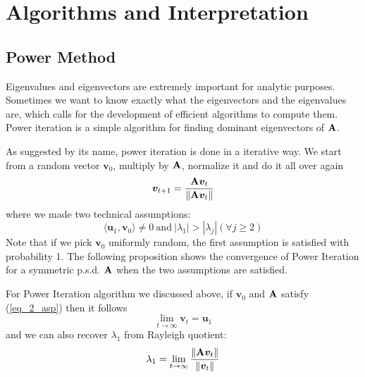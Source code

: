 \documentclass[../main.tex]{subfiles}
\begin{document}
\section{Algorithms and Interpretation}
\subsection{Power Method}
Eigenvalues and eigenvectors are extremely important for analytic purposes. Sometimes we want to know exactly what the eigenvectors and the eigenvalues are, which calls for the development of efficient algorithms to compute them. Power iteration is a simple algorithm for finding dominant eigenvectors of ${\bf A}$.
\par As suggested by its name, power iteration is done in a iterative way. We start from a random vector $\bm{v}_0$, multiply by ${\bf A}$, normalize it and do it all over again
\begin{equation*}
\bm{v}_{t+1} = \frac{{\bf A}\bm{v}_t}{\|{\bf A}\bm{v}_t\|}
\end{equation*}
where we made two technical assumptions:
\begin{equation}\label{eq_2_asp}
\langle \bm{u}_1,\bm{v}_0\rangle\neq 0\ \text{and}\ |\lambda_1|>|\lambda_j|(\forall j\geq2)
\end{equation}
Note that if we pick $\bm{v}_0$ uniformly random, the first assumption is satisfied with probability 1. The following proposition shows the convergence of Power Iteration for a symmetric p.s.d. ${\bf A}$ when the two assumptions are satisfied.
\begin{proposition}
	For Power Iteration algorithm we discussed above, if $\bm{v}_0$ and ${\bf A}$ satisfy (\ref{eq_2_asp}) then it follows
	\begin{equation*}
	\lim_{t\rightarrow\infty}\bm{v}_t=\bm{u}_1
	\end{equation*}
	and we can also recover $\lambda_1$ from Rayleigh quotient:
	\begin{equation*}
	\lambda_1 = \lim_{t\rightarrow \infty} \frac{\|{\bf A}\bm{v}_t\|}{\|\bm{v}_t\|}
	\end{equation*}
\end{proposition}
\end{document}
